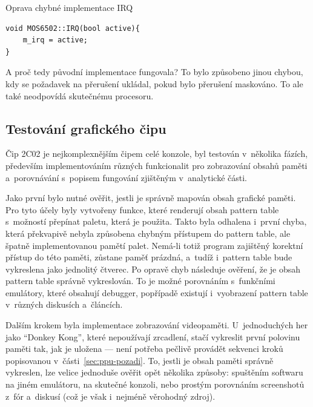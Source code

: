 \begin{listing}[ht!]
	\caption{Oprava chybné implementace IRQ}
	\label{list:6502-preruseni-irq-oprava}
	\begin{verbatim}
void MOS6502::IRQ(bool active){
	m_irq = active;
}
	\end{verbatim}
\end{listing}


\begin{note}
A proč tedy původní implementace fungovala? To bylo způsobeno jinou chybou, kdy se požadavek na přerušení ukládal, pokud bylo přerušení maskováno. To ale také neodpovídá skutečnému procesoru.
\end{note}

\subsection{Testování grafického čipu}
Čip 2C02 je nejkomplexnějším čipem celé konzole, byl testován v~několika fázích, především implementováním různých funkcionalit pro zobrazování obsahů paměti a~porovnávání s~popisem fungování zjištěným v~analytické části.

Jako první bylo nutné ověřit, jestli je správně mapován obsah grafické paměti. Pro tyto účely byly vytvořeny funkce, které renderují obsah pattern table s~možností přepínat paletu, která je použita. Takto byla odhalena i~první chyba, která překvapivě nebyla způsobena chybným přístupem do pattern table, ale špatně implementovanou pamětí palet. Nemá-li totiž program zajištěný korektní přístup do této paměti, zůstane paměť prázdná, a~tudíž i~pattern table bude vykreslena jako jednolitý čtverec. Po opravě chyb následuje ověření, že je obsah pattern table správně vykreslován. To je možné porovnáním s~funkčními emulátory, které obsahují debugger, popřípadě existují i~vyobrazení pattern table v~různých diskusích a~článcích.

Dalším krokem byla implementace zobrazování videopaměti. U~jednoduchých her jako \enquote{Donkey Kong}, které nepoužívají zrcadlení, stačí vykreslit první polovinu paměti tak, jak je uložena --- není potřeba pečlivě provádět sekvenci kroků popisovanou v~části~\ref{sec:ppu-pozadi}. To, jestli je obsah paměti správně vykreslen, lze velice jednoduše ověřit opět několika způsoby: spuštěním softwaru na jiném emulátoru, na skutečné konzoli, nebo prostým porovnáním screenshotů z~fór a~diskusí (což je však i~nejméně věrohodný zdroj).

